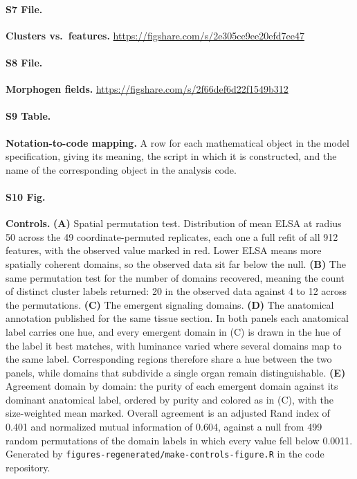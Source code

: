\documentclass[10pt,letterpaper]{article}
\begin{document}
\paragraph*{S7 File.}
\label{S7_File}
\textbf{Clusters vs.\ features.} \url{https://figshare.com/s/2e305ce9ee20efd7ee47}

\paragraph*{S8 File.}
\label{S8_File}
\textbf{Morphogen fields.} \url{https://figshare.com/s/2f66def6d22f1549b312}

\paragraph*{S9 Table.}
\label{S9_Table}
\textbf{Notation-to-code mapping.} A row for each mathematical object in the model
specification, giving its meaning, the script in which it is constructed, and the name of
the corresponding object in the analysis code.

\paragraph*{S10 Fig.}
\label{S10_Fig}
\textbf{Controls.} \textbf{(A)} Spatial permutation test. Distribution of mean ELSA at radius
50 across the 49 coordinate-permuted replicates, each one a full refit of all 912 features,
with the observed value marked in red. Lower ELSA means more spatially coherent domains, so
the observed data sit far below the null. \textbf{(B)} The same permutation test for the
number of domains recovered, meaning the count of distinct cluster labels returned: 20 in the
observed data against 4 to 12 across the permutations. \textbf{(C)} The emergent signaling
domains. \textbf{(D)} The anatomical annotation published for the same tissue section. In both
panels each anatomical label carries one hue, and every emergent domain in (C) is drawn in the
hue of the label it best matches, with luminance varied where several domains map to the same
label. Corresponding regions therefore share a hue between the two panels, while domains that
subdivide a single organ remain distinguishable. \textbf{(E)} Agreement domain by domain: the
purity of each emergent domain against its dominant anatomical label, ordered by purity and
colored as in (C), with the size-weighted mean marked. Overall agreement is an adjusted Rand
index of 0.401 and normalized mutual information of 0.604, against a null from 499 random
permutations of the domain labels in which every value fell below 0.0011. Generated by
\texttt{figures-regenerated/make-controls-figure.R} in the code repository.
\end{document}
